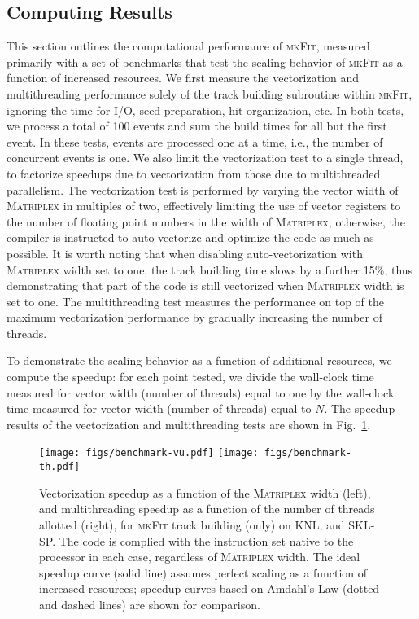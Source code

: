 \documentclass[a4paper,11pt]{article}
\newcommand{\mplex}{\textsc{Matriplex}\xspace}
\newcommand{\mkFit}{\textsc{mkFit}\xspace}
\begin{document}

\subsection{Computing Results}
\label{computing}
This section outlines the computational performance of \mkFit, measured primarily with a set of benchmarks 
that test the scaling behavior of \mkFit as a function of increased resources. 
We first measure the vectorization and multithreading performance solely of the track building subroutine within \mkFit, ignoring the time for I/O, seed preparation, hit organization, etc. In both tests, we process a total of 100 events and sum the build times for all but the first event. In these tests, events are processed one at a time, i.e., the number of concurrent events is one. We also limit the vectorization test to a single thread, to factorize speedups due to vectorization from those due to multithreaded parallelism. 
The vectorization test is performed by varying the vector width of \mplex in multiples of two, effectively limiting the use of vector registers to the number of floating point numbers in the width of \mplex; otherwise, the compiler is instructed to auto-vectorize and optimize the code as much as possible. It is worth noting that when disabling auto-vectorization with \mplex width set to one, the track building time slows by a further 15\%, thus demonstrating that part of the code is still vectorized when \mplex width is set to one.
The multithreading test measures the performance on top of the maximum vectorization performance by gradually increasing the number of threads. 

To demonstrate the scaling behavior as a function of additional resources, we compute the speedup: for each point tested, we divide the wall-clock time measured for vector width (number of threads) equal to one by the wall-clock time measured for vector width (number of threads) equal to $N$. The speedup results of the vectorization and multithreading tests are shown in Fig.~\ref{fig:mkfit_time_benchmarks}.

\begin{figure}[htbp]
  \begin{center}
    \texttt{[image: figs/benchmark-vu.pdf]}
    \texttt{[image: figs/benchmark-th.pdf]}
    \caption{Vectorization speedup as a function of the \mplex width (left), and multithreading speedup as a function of the number of threads allotted (right), for \mkFit track building (only) on KNL, and SKL-SP. The code is complied with the instruction set native to the processor in each case, regardless of \mplex width. The ideal speedup curve (solid line) assumes perfect scaling as a function of increased resources; speedup curves based on Amdahl's Law (dotted and dashed lines) are shown for comparison.}
    \label{fig:mkfit_time_benchmarks}
  \end{center}
\end{figure}
\end{document}
